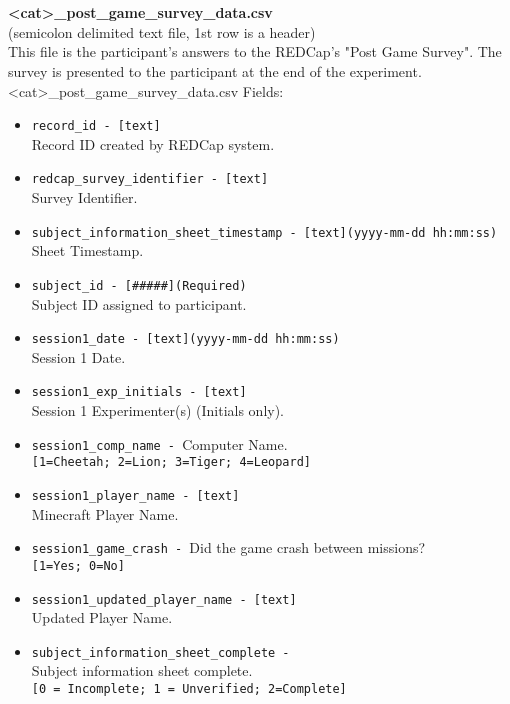 \begin{description}
\begin{addmargin}[0em]{0em}
    \textbf{\\\\}
    \begin{addmargin}[1em]{0em} %
        \label{<cat>_post_game_survey_data.csv}
        \textbf{<cat>\_post\_game\_survey\_data.csv}\\(semicolon delimited text file, 1st row is a header)\\
        This file is the participant's answers to the REDCap's "Post Game Survey".
        The survey is presented to the participant at the end of the experiment.\\ 
        <cat>\_post\_game\_survey\_data.csv Fields:
        \begin{itemize}
            \item \verb|record_id - [text]|\\Record ID created by REDCap system.
            \item \verb|redcap_survey_identifier - [text]|\\Survey Identifier.
            \item \verb|subject_information_sheet_timestamp - [text](yyyy-mm-dd hh:mm:ss)|\\Sheet Timestamp.
            \item \verb|subject_id - [#####](Required)|\\Subject ID assigned to participant.
            \item \verb|session1_date - [text](yyyy-mm-dd hh:mm:ss)|\\Session 1 Date.
            \item \verb|session1_exp_initials - [text]|\\Session 1 Experimenter(s) (Initials only).
            \item \verb|session1_comp_name - |Computer Name.\\\verb|[1=Cheetah; 2=Lion; 3=Tiger; 4=Leopard]|
            \item \verb|session1_player_name - [text]|\\Minecraft Player Name.
            \item \verb|session1_game_crash - |Did the game crash between missions?\\\verb|[1=Yes; 0=No]|
            \item \verb|session1_updated_player_name - [text]|\\Updated Player Name.
            \item \verb|subject_information_sheet_complete - |\\Subject information sheet complete.\\\verb|[0 = Incomplete; 1 = Unverified; 2=Complete]|

\end{itemize}
\end{addmargin}
\end{addmargin}
\end{description}
